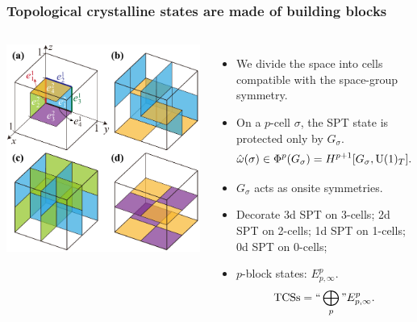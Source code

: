 \documentclass[xcolor=table, aspectratio=43,ignorenonframetext]{beamer}
\newcommand{\uone}{\text U(1)}
\begin{document}
\begin{frame}
	\frametitle{Topological crystalline states are made of building blocks}
	\begin{columns}
		\begin{center}
			\includegraphics[width=\textwidth]{../spspt/blocks}
		\end{center}
		\begin{itemize}
			\item We divide the space into cells compatible with the space-group symmetry.
			\item On a $p$-cell $\sigma$, the SPT state is protected only by $G_\sigma$.
			\[\hat\omega(\sigma)\in \Phi^p(G_\sigma) = H^{p+1}[G_\sigma,\uone_T].\]
			\item $G_\sigma$ acts as onsite symmetries.
			\item Decorate 3d SPT on 3-cells; 2d SPT on 2-cells; 1d SPT on 1-cells; 0d SPT on 0-cells;
			\item $p$-block states: $E^p_{p,\infty}$.
			\[\text{TCSs} = ``\bigoplus_p\text{''} E^p_{p,\infty}.\]
		\end{itemize}
	\end{columns}
\end{frame}
\end{document}

